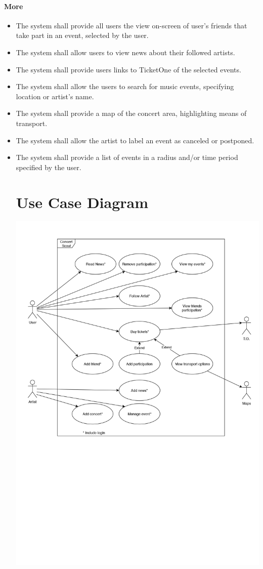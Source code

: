 \documentclass[11pt,a4paper]{article}
\begin{document}
\paragraph{More}
\begin{itemize}
\item The system shall provide all users the view on-screen of user’s friends that take part in an event, selected by the user.
\item The system shall allow users to view news about their followed artists.
\item The system shall provide users links to TicketOne of the selected events.
\item The system shall allow the users to search for music events, specifying location or artist’s name.
\item The system shall provide a map of the concert area, highlighting means of transport.
\item The system shall allow the artist to label an event as canceled or postponed.
\item The system shall provide a list of events in a radius and/or time period specified by the user.
\section{Use Case Diagram}
\includegraphics[scale=0.7]{UseCaseFinal.jpg}

\end{itemize}
\end{document}
